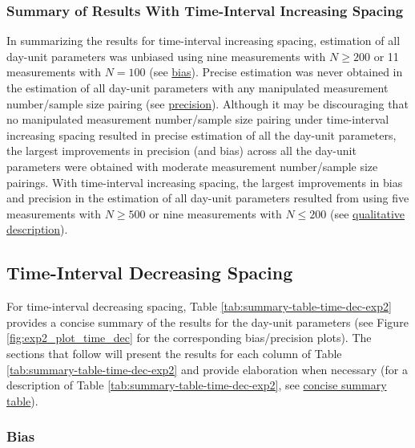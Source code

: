 \documentclass[
12pt, %
twoside,
english]{guelphthesis}
\begin{document}
\hypertarget{summary-of-results-with-time-interval-increasing-spacing-1}{%
\subsubsection{Summary of Results With Time-Interval Increasing Spacing}\label{summary-of-results-with-time-interval-increasing-spacing-1}}

In summarizing the results for time-interval increasing spacing, estimation of all day-unit parameters was unbiased using nine measurements with \(N \ge 200\) or 11 measurements with \(N = 100\) (see \protect\hyperlink{bias-time-inc-exp2}{bias}). Precise estimation was never obtained in the estimation of all day-unit parameters with any manipulated measurement number/sample size pairing (see \protect\hyperlink{precision-time-inc-exp2}{precision}). Although it may be discouraging that no manipulated measurement number/sample size pairing under time-interval increasing spacing resulted in precise estimation of all the day-unit parameters, the largest improvements in precision (and bias) across all the day-unit parameters were obtained with moderate measurement number/sample size pairings. With time-interval increasing spacing, the largest improvements in bias and precision in the estimation of all day-unit parameters resulted from using five measurements with \(N \ge 500\) or nine measurements with \(N \le 200\) (see \protect\hyperlink{qualitative-time-inc-exp2}{qualitative description}).

\hypertarget{time-interval-decreasing-spacing-1}{%
\subsection{Time-Interval Decreasing Spacing}\label{time-interval-decreasing-spacing-1}}

For time-interval decreasing spacing, Table \ref{tab:summary-table-time-dec-exp2} provides a concise summary of the results for the day-unit parameters (see Figure \ref{fig:exp2_plot_time_dec} for the corresponding bias/precision plots). The sections that follow will present the results for each column of Table \ref{tab:summary-table-time-dec-exp2} and provide elaboration when necessary (for a description of Table \ref{tab:summary-table-time-dec-exp2}, see \protect\hyperlink{concise-example}{concise summary table}).

\hypertarget{bias-time-dec-exp2}{%
\subsubsection{Bias}\label{bias-time-dec-exp2}}
\end{document}
